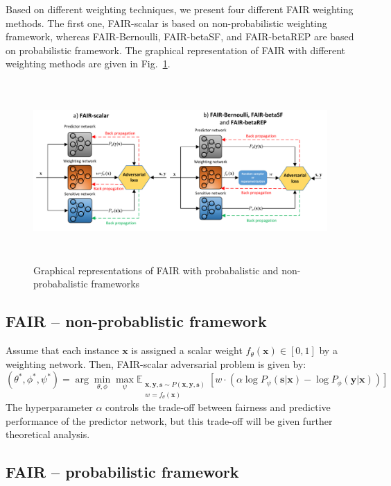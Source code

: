 \documentclass[preprint,12pt]{elsarticle}
\begin{document}
Based on different weighting techniques, we present four different FAIR weighting methods. The first one, FAIR-scalar is based on non-probabilistic weighting framework, whereas FAIR-Bernoulli, FAIR-betaSF, and FAIR-betaREP are based on probabilistic framework. The graphical representation of FAIR with different weighting methods are given in Fig.~\ref{fig:Fig1}.

\begin{figure}[t!]
	\vskip 0.2in
	\center
	\includegraphics[angle=0, width=1\textwidth, height = 2.7in]{Fig1.pdf}
	\captionsetup{justification=centering}
	\caption{Graphical representations of FAIR with probabalistic and non-probabalistic frameworks}
	\label{fig:Fig1}
	\vskip -0.2in
\end{figure}

\subsection{FAIR -- non-probablistic framework}
Assume that each instance $\mathbf{x}$ is assigned a scalar weight $f_\theta(\mathbf{x})\in[0,1]$ by a weighting network. Then, FAIR-scalar adversarial problem is given by:
\begin{equation}
\label{Eq:Loss-scalar}
(\theta^*,\phi^*,\psi^*) = \arg\min_{\theta,\phi}\max_{\psi}\mathbb{E}_{\substack{\mathbf{x},\mathbf{y},\mathbf{s} \sim P(\mathbf{x},\mathbf{y},\mathbf{s})\\w=f_\theta(\mathbf{x})}} [w \cdot(\alpha\log P_{\psi}(\mathbf{s}|\mathbf{x})
- \log P_{\phi}(\mathbf{y}|\mathbf{x}))]
\end{equation}
The hyperparameter $\alpha$ controls the trade-off between fairness and predictive performance of the predictor network, but this trade-off will be given further theoretical analysis.


\subsection{FAIR -- probabilistic framework}
\end{document}
